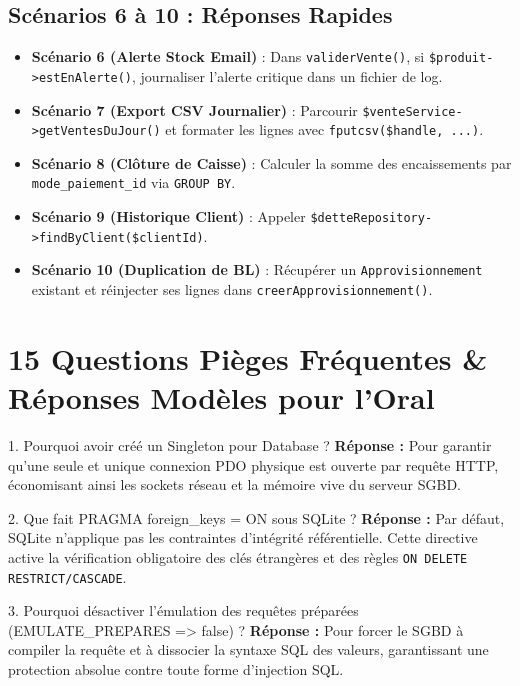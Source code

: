 \documentclass[11pt,a4paper,titlepage,twoside,openright]{report}
\begin{document}
\subsection{Scénarios 6 à 10 : Réponses Rapides}
\begin{itemize}
    \item \textbf{Scénario 6 (Alerte Stock Email)} : Dans \texttt{validerVente()}, si \texttt{\$produit->estEnAlerte()}, journaliser l'alerte critique dans un fichier de log.
    \item \textbf{Scénario 7 (Export CSV Journalier)} : Parcourir \texttt{\$venteService->getVentesDuJour()} et formater les lignes avec \texttt{fputcsv(\$handle, ...)}.
    \item \textbf{Scénario 8 (Clôture de Caisse)} : Calculer la somme des encaissements par \texttt{mode\_paiement\_id} via \texttt{GROUP BY}.
    \item \textbf{Scénario 9 (Historique Client)} : Appeler \texttt{\$detteRepository->findByClient(\$clientId)}.
    \item \textbf{Scénario 10 (Duplication de BL)} : Récupérer un \texttt{Approvisionnement} existant et réinjecter ses lignes dans \texttt{creerApprovisionnement()}.
\end{itemize}

\section{15 Questions Pièges Fréquentes \& Réponses Modèles pour l'Oral}

\begin{oralbox}{1. Pourquoi avoir créé un Singleton pour Database ?}
\textbf{Réponse :} Pour garantir qu'une seule et unique connexion PDO physique est ouverte par requête HTTP, économisant ainsi les sockets réseau et la mémoire vive du serveur SGBD.
\end{oralbox}

\begin{oralbox}{2. Que fait PRAGMA foreign\_keys = ON sous SQLite ?}
\textbf{Réponse :} Par défaut, SQLite n'applique pas les contraintes d'intégrité référentielle. Cette directive active la vérification obligatoire des clés étrangères et des règles \texttt{ON DELETE RESTRICT/CASCADE}.
\end{oralbox}

\begin{oralbox}{3. Pourquoi désactiver l'émulation des requêtes préparées (EMULATE\_PREPARES => false) ?}
\textbf{Réponse :} Pour forcer le SGBD à compiler la requête et à dissocier la syntaxe SQL des valeurs, garantissant une protection absolue contre toute forme d'injection SQL.
\end{oralbox}
\end{document}
